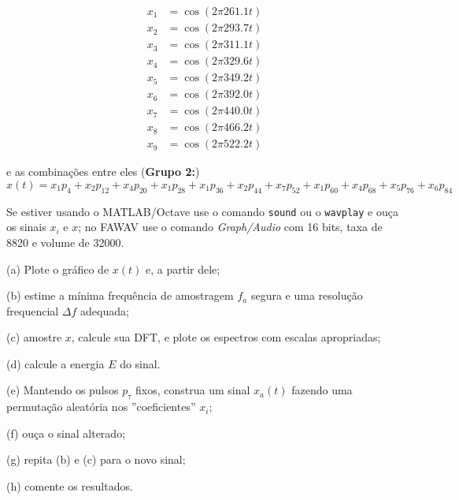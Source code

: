 \documentclass[10pt]{article}
\begin{document}
\begin{flushleft}
\begin{align*}
    x_1 &= \cos(2 \pi 261.1 t)\\
    x_2 &= \cos(2 \pi 293.7 t)\\
    x_3 &= \cos(2 \pi 311.1 t)\\
    x_4 &= \cos(2 \pi 329.6 t)\\
    x_5 &= \cos(2 \pi 349.2 t)\\
    x_6 &= \cos(2 \pi 392.0 t)\\
    x_7 &= \cos(2 \pi 440.0 t)\\
    x_8 &= \cos(2 \pi 466.2 t)\\
    x_9 &= \cos(2 \pi 522.2 t)
\end{align*}
\end{flushleft}
e as combinações entre eles (\textbf{Grupo 2:})
\[x(t) = x_1p_4 + x_2p_{12} + x_4p_{20} + x_1p_{28} + x_1p_{36} + x_2p_{44} + x_7p_{52} + x_1p_{60} + x_4p_{68} + x_5p_{76} + x_6p_{84}\]

Se estiver usando o MATLAB/Octave use o comando \texttt{sound} ou o \texttt{wavplay} e ouça os sinais $x_i$ e $x$; no FAWAV use o comando \emph{Graph/Audio} com 16 bits, taxa de 8820 e volume de 32000.

(a) Plote o gráfico de $x(t)$ e, a partir dele;

(b) estime a mínima frequência de amostragem $f_a$ segura e uma resolução frequencial $\Delta f$ adequada;

(c) amostre $x$, calcule sua DFT, e plote os espectros com escalas apropriadas;

(d) calcule a energia $E$ do sinal.

(e) Mantendo os pulsos $p_{\tau}$ fixos, construa um sinal $x_a(t)$ fazendo uma permutação aleatória nos ''coeficientes'' $x_i$;

(f) ouça o sinal alterado;

(g) repita (b) e (c) para o novo sinal;

(h) comente os resultados.
\end{document}
